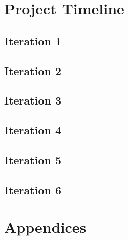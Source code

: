 \documentclass[onecolumn, draftclsnofoot,10pt, compsoc]{IEEEtran}
\begin{document}
	\section{Project Timeline}
		\subsection{Iteration 1}
		\subsection{Iteration 2}
		\subsection{Iteration 3}
		\subsection{Iteration 4}
		\subsection{Iteration 5}
		\subsection{Iteration 6}


	\section{Appendices} %
\end{document}
